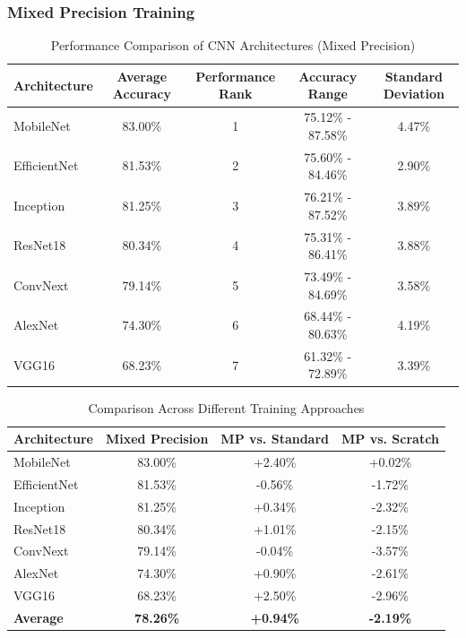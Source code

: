 \documentclass[11pt]{article}
\begin{document}
\subsubsection{Mixed Precision Training}
\begin{table}[ht]
    \centering
    \begin{tabular}{lcccc}
    \toprule
    \textbf{Architecture} & \textbf{Average Accuracy} & \textbf{Performance Rank} & \textbf{Accuracy Range} & \textbf{Standard Deviation} \\
    \midrule
    MobileNet & 83.00\% & 1 & 75.12\% - 87.58\% & 4.47\% \\
    EfficientNet & 81.53\% & 2 & 75.60\% - 84.46\% & 2.90\% \\
    Inception & 81.25\% & 3 & 76.21\% - 87.52\% & 3.89\% \\
    ResNet18 & 80.34\% & 4 & 75.31\% - 86.41\% & 3.88\% \\
    ConvNext & 79.14\% & 5 & 73.49\% - 84.69\% & 3.58\% \\
    AlexNet & 74.30\% & 6 & 68.44\% - 80.63\% & 4.19\% \\
    VGG16 & 68.23\% & 7 & 61.32\% - 72.89\% & 3.39\% \\
    \bottomrule
    \end{tabular}
    \caption{Performance Comparison of CNN Architectures (Mixed Precision)}
    \label{tab:mixed_precision}
\end{table}
\begin{table}[ht]
    \centering
    \begin{tabular}{lccc}
    \toprule
    \textbf{Architecture} & \textbf{Mixed Precision} & \textbf{MP vs. Standard} & \textbf{MP vs. Scratch} \\
    \midrule
    MobileNet & 83.00\% & +2.40\% & +0.02\% \\
    EfficientNet & 81.53\% & -0.56\% & -1.72\% \\
    Inception & 81.25\% & +0.34\% & -2.32\% \\
    ResNet18 & 80.34\% & +1.01\% & -2.15\% \\
    ConvNext & 79.14\% & -0.04\% & -3.57\% \\
    AlexNet & 74.30\% & +0.90\% & -2.61\% \\
    VGG16 & 68.23\% & +2.50\% & -2.96\% \\
    \midrule
    \textbf{Average} & \textbf{78.26\%} & \textbf{+0.94\%} & \textbf{-2.19\%} \\
    \bottomrule
    \end{tabular}
    \caption{Comparison Across Different Training Approaches}
    \label{tab:training_approaches}
\end{table}
\end{document}
